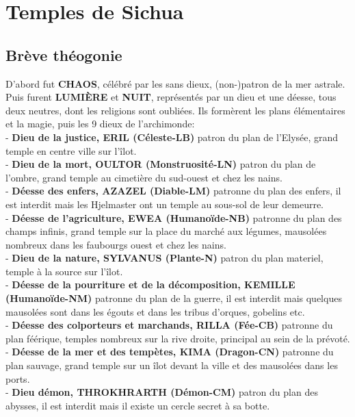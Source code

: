 \section{Temples de Sichua}

\subsection{Brève théogonie}
D'abord fut {\bf CHAOS}, célébré par les sans dieux, (non-)patron de la mer 
astrale. \\
Puis furent {\bf LUMIÈRE} et {\bf NUIT}, représentés par un dieu et une déesse, 
tous deux neutres, dont les religions sont oubliées. Ils formèrent les plans 
élémentaires et la magie, puis les 9 dieux de l'archimonde: \\
- {\bf Dieu de la justice, ERIL (Céleste-LB)} patron du plan de l'Elysée, grand 
       temple en centre ville sur l'îlot. \\
- {\bf Dieu de la mort, OULTOR (Monstruosité-LN)} patron du plan de l'ombre, 
       grand temple au cimetière du sud-ouest et chez les nains. \\
- {\bf Déesse des enfers, AZAZEL (Diable-LM)} patronne du plan des enfers, il 
       est interdit mais les Hjelmaster ont un temple au sous-sol de leur 
       demeurre. \\
- {\bf Déesse de l'agriculture, EWEA (Humanoïde-NB)} patronne du plan des 
       champs infinis, grand temple sur la place du marché aux légumes, 
       mausolées nombreux dans les faubourgs ouest et chez les nains. \\
- {\bf Dieu de la nature, SYLVANUS (Plante-N)} patron du plan materiel, temple 
       à la source sur l'îlot. \\
- {\bf Déesse de la pourriture et de la décomposition, KEMILLE (Humanoïde-NM)} 
       patronne du plan de la guerre, il est interdit mais quelques mausolées 
       sont dans les égouts et dans les tribus d'orques, gobelins etc. \\
- {\bf Déesse des colporteurs et marchands, RILLA (Fée-CB)} patronne du plan 
       féérique, temples nombreux sur la rive droite, principal au sein de la 
       prévoté. \\
- {\bf Déesse de la mer et des tempètes, KIMA (Dragon-CN)} patronne du plan 
       sauvage, grand temple sur un îlot devant la ville et des mausolées 
       dans les ports. \\
- {\bf Dieu démon, THROKHRARTH (Démon-CM)} patron du plan des abysses, il est 
       interdit mais il existe un cercle secret à sa botte. \\

